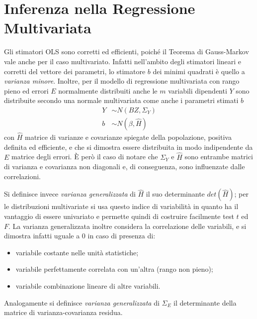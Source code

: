 \documentclass[a4page, 11pt]{article} %
\begin{document}
\section{Inferenza nella Regressione Multivariata}
Gli stimatori OLS sono corretti ed efficienti, poiché il Teorema di Gauss-Markov vale anche per il caso multivariato.
Infatti nell'ambito degli stimatori lineari e corretti del vettore dei parametri, lo stimatore $b$ dei minimi quadrati è quello a \textit{varianza minore}.
Inoltre, per il modello di regressione multivariata con rango pieno ed errori $E$ normalmente distribuiti anche le $m$ variabili dipendenti $Y$ sono distribuite secondo una normale multivariata come anche i parametri stimati $b$
\begin{align*}
  Y &\sim N(BZ, \Sigma_Y) \\
  b & \sim N(\beta, \hat{H})
\end{align*}
con $\hat{H}$ matrice di varianze e covarianze spiegate della popolazione, positiva definita ed efficiente, e che si dimostra essere distribuita in modo indipendente da $E$ matrice degli errori.
È però il caso di notare che $\Sigma_Y$ e $\hat{H}$ sono entrambe matrici di varianza e covarianza non diagonali e, di conseguenza, sono influenzate dalle correlazioni.

Si definisce invece \textit{varianza generalizzata} di $\hat{H}$ il suo determinante $det(\hat{H})$; per le distribuzioni multivariate si usa questo indice di variabilità in quanto ha il vantaggio di essere univariato e permette quindi di costruire facilmente test $t$ ed $F$.
La varianza generalizzata inoltre considera la correlazione delle variabili, e si  dimostra infatti uguale a $0$ in caso di presenza di:
\begin{itemize}[noitemsep]
\item variabile costante nelle unità statistiche;
\item variabile perfettamente correlata con un'altra (rango non pieno);
\item variabile combinazione lineare di altre variabili.
\end{itemize}
Analogamente si definisce \textit{varianza generalizzata} di $\Sigma_E$ il determinante della matrice di varianza-covarianza residua. \newline
\end{document}
